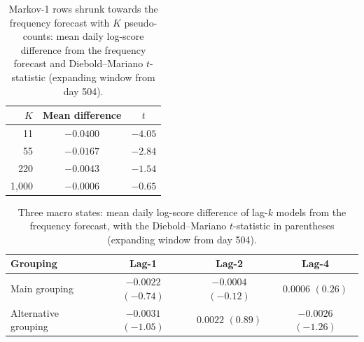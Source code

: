 \documentclass[11pt]{article}
\begin{document}
\begin{table}[htbp]\centering
\caption{Markov-1 rows shrunk towards the frequency forecast with $K$ pseudo-counts: mean daily log-score difference from the frequency forecast and Diebold--Mariano $t$-statistic (expanding window from day 504).}
\label{tab:shrink}
\begin{tabular}{rcc}
\toprule
$K$ & Mean difference & $t$ \\
\midrule
11 & $-0.0400$ & $-4.05$ \\
55 & $-0.0167$ & $-2.84$ \\
220 & $-0.0043$ & $-1.54$ \\
1{,}000 & $-0.0006$ & $-0.65$ \\
\bottomrule
\end{tabular}
\end{table}

\begin{table}[htbp]\centering
\caption{Three macro states: mean daily log-score difference of lag-$k$ models from the frequency forecast, with the Diebold--Mariano $t$-statistic in parentheses (expanding window from day 504).}
\label{tab:macro}
\begin{tabular}{lccc}
\toprule
Grouping & Lag-1 & Lag-2 & Lag-4 \\
\midrule
Main grouping & $-0.0022$ $(-0.74)$ & $-0.0004$ $(-0.12)$ & $0.0006$ $(0.26)$ \\
Alternative grouping & $-0.0031$ $(-1.05)$ & $0.0022$ $(0.89)$ & $-0.0026$ $(-1.26)$ \\
\bottomrule
\end{tabular}
\end{table}
\end{document}
